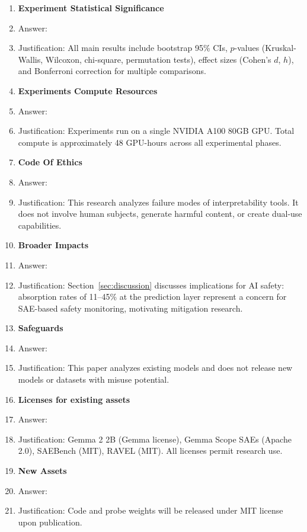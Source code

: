 \documentclass{article}
\begin{document}
\begin{enumerate}
\item {\bf Experiment Statistical Significance}
    \item[] Answer: \answerYes{}
    \item[] Justification: All main results include bootstrap 95\% CIs, $p$-values (Kruskal-Wallis, Wilcoxon, chi-square, permutation tests), effect sizes (Cohen's $d$, $h$), and Bonferroni correction for multiple comparisons.

\item {\bf Experiments Compute Resources}
    \item[] Answer: \answerYes{}
    \item[] Justification: Experiments run on a single NVIDIA A100 80GB GPU. Total compute is approximately 48 GPU-hours across all experimental phases.

\item {\bf Code Of Ethics}
    \item[] Answer: \answerYes{}
    \item[] Justification: This research analyzes failure modes of interpretability tools. It does not involve human subjects, generate harmful content, or create dual-use capabilities.

\item {\bf Broader Impacts}
    \item[] Answer: \answerYes{}
    \item[] Justification: Section~\ref{sec:discussion} discusses implications for AI safety: absorption rates of 11--45\% at the prediction layer represent a concern for SAE-based safety monitoring, motivating mitigation research.

\item {\bf Safeguards}
    \item[] Answer: \answerNA{}
    \item[] Justification: This paper analyzes existing models and does not release new models or datasets with misuse potential.

\item {\bf Licenses for existing assets}
    \item[] Answer: \answerYes{}
    \item[] Justification: Gemma 2 2B (Gemma license), Gemma Scope SAEs (Apache 2.0), SAEBench (MIT), RAVEL (MIT). All licenses permit research use.

\item {\bf New Assets}
    \item[] Answer: \answerYes{}
    \item[] Justification: Code and probe weights will be released under MIT license upon publication.


\end{enumerate}
\end{document}
